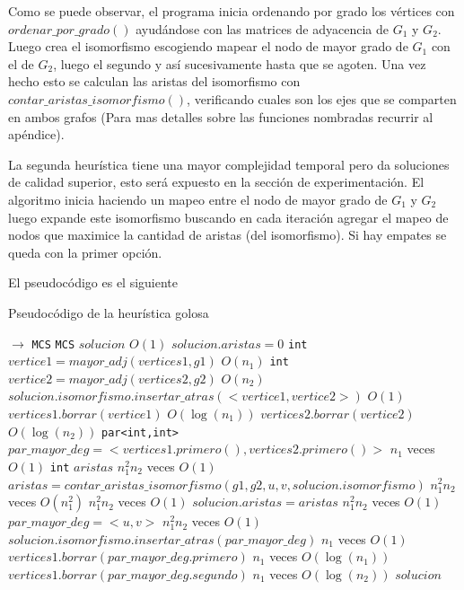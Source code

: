 Como se puede observar, el programa inicia ordenando por grado los vértices con $ordenar\_por\_grado()$ ayudándose con las matrices de adyacencia de $G_1$ y $G_2$. Luego crea el isomorfismo escogiendo mapear el nodo de mayor grado de $G_1$ con el de $G_2$, luego el segundo y así sucesivamente hasta que se agoten. Una vez hecho esto se calculan las aristas del isomorfismo con $contar\_aristas\_isomorfismo()$, verificando cuales son los ejes que se comparten en ambos grafos (Para mas detalles sobre las funciones nombradas recurrir al apéndice).

La segunda heurística tiene una mayor complejidad temporal pero da soluciones de calidad superior, esto será expuesto en la sección de experimentación. El algoritmo inicia haciendo un mapeo entre el nodo de mayor grado de $G_1$ y $G_2$ luego expande este isomorfismo buscando en cada iteración agregar el mapeo de nodos que maximice la cantidad de aristas (del isomorfismo). Si hay empates se queda con la primer opción.

El pseudocódigo es el siguiente

\begin{algorithm}[H]
  \begin{algorithmic}[1]
  \caption{Pseudocódigo de la heurística golosa}
  \label{algo:4-2}
     $\to$ \texttt{MCS}
      \State \texttt{MCS} $solucion$ 
        \Comment $O(1)$ 
      \State $solucion.aristas = 0$ 
      \State \texttt{int} $vertice1 = mayor\_adj(vertices1,g1)$ 
      \Comment $O(n_1)$ 
      \State \texttt{int} $vertice2 = mayor\_adj(vertices2,g2)$ 
      \Comment $O(n_2)$ 
      \State $solucion.isomorfismo.insertar\_atras(<vertice1,vertice2>)$
      \Comment $O(1)$
      \State $vertices1.borrar(vertice1)$ 
      \Comment $O(\log(n_1))$ 
      \State $vertices2.borrar(vertice2)$ 
      \Comment $O(\log(n_2))$
	  \State \texttt{par<int,int>}  $par\_mayor\_deg = <vertices1.primero(),vertices2.primero()>$ 
    \Comment $n_1$ veces $O(1)$
	  \State \texttt{int} $aristas$
    \Comment $n_1^2n_2$ veces $O(1)$
	  \State $ aristas = contar\_aristas\_isomorfismo(g1,g2,u,v, solucion.isomorfismo)$
    \Comment $n_1^2n_2$ veces $O(n_1^2)$
      \Comment $n_1^2n_2$ veces $O(1)$
      \State $solucion.aristas = aristas$
      \Comment $n_1^2n_2$ veces $O(1)$
      \State $par\_mayor\_deg = <u,v>$
      \Comment $n_1^2n_2$ veces $O(1)$
      \EndIf
	  \EndFor
	  \EndFor	 
	  \State  $solucion.isomorfismo.insertar\_atras(par\_mayor\_deg)$
      \Comment $n_1$ veces $O(1)$
	  \State $ vertices1.borrar(par\_mayor\_deg.primero)$
      \Comment $n_1$ veces $O(\log(n_1))$
	  \State $ vertices1.borrar(par\_mayor\_deg.segundo)$
      \Comment $n_1$ veces $O(\log(n_2))$
	  \EndWhile      
        \State \Return $solucion$
      \EndProcedure
	\end{algorithmic}
\end{algorithm}

